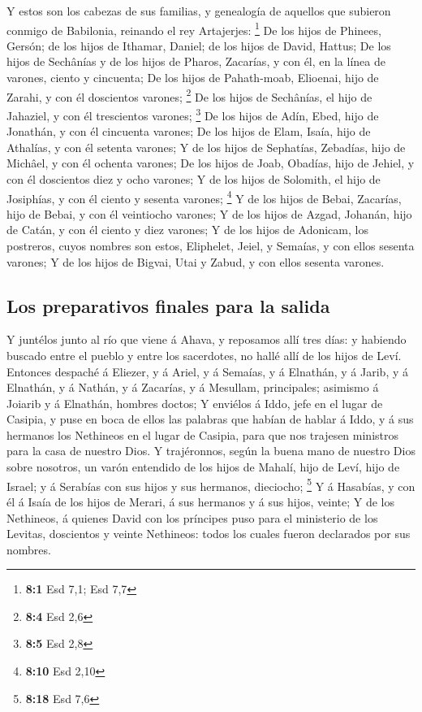  Y estos son los cabezas de sus familias, y genealogía de
aquellos que subieron conmigo de Babilonia, reinando el rey Artajerjes:
\footnote{\textbf{8:1} Esd 7,1; Esd 7,7}  De los hijos de
Phinees, Gersón; de los hijos de Ithamar, Daniel; de los hijos de David,
Hattus;  De los hijos de Sechânías y de los hijos de
Pharos, Zacarías, y con él, en la línea de varones, ciento y cincuenta;
 De los hijos de Pahath-moab, Elioenai, hijo de Zarahi, y
con él doscientos varones; \footnote{\textbf{8:4} Esd 2,6}
 De los hijos de Sechânías, el hijo de Jahaziel, y con él
trescientos varones; \footnote{\textbf{8:5} Esd 2,8}  De
los hijos de Adín, Ebed, hijo de Jonathán, y con él cincuenta varones;
 De los hijos de Elam, Isaía, hijo de Athalías, y con él
setenta varones;  Y de los hijos de Sephatías, Zebadías,
hijo de Michâel, y con él ochenta varones;  De los hijos
de Joab, Obadías, hijo de Jehiel, y con él doscientos diez y ocho
varones;  Y de los hijos de Solomith, el hijo de
Josiphías, y con él ciento y sesenta varones; \footnote{\textbf{8:10}
  Esd 2,10}  Y de los hijos de Bebai, Zacarías, hijo de
Bebai, y con él veintiocho varones;  Y de los hijos de
Azgad, Johanán, hijo de Catán, y con él ciento y diez varones;
 Y de los hijos de Adonicam, los postreros, cuyos nombres
son estos, Eliphelet, Jeiel, y Semaías, y con ellos sesenta varones;
 Y de los hijos de Bigvai, Utai y Zabud, y con ellos
sesenta varones.

\hypertarget{los-preparativos-finales-para-la-salida}{%
\subsection{Los preparativos finales para la
salida}\label{los-preparativos-finales-para-la-salida}}

 Y juntélos junto al río que viene á Ahava, y reposamos
allí tres días: y habiendo buscado entre el pueblo y entre los
sacerdotes, no hallé allí de los hijos de Leví.  Entonces
despaché á Eliezer, y á Ariel, y á Semaías, y á Elnathán, y á Jarib, y á
Elnathán, y á Nathán, y á Zacarías, y á Mesullam, principales; asimismo
á Joiarib y á Elnathán, hombres doctos;  Y enviélos á
Iddo, jefe en el lugar de Casipia, y puse en boca de ellos las palabras
que habían de hablar á Iddo, y á sus hermanos los Nethineos en el lugar
de Casipia, para que nos trajesen ministros para la casa de nuestro
Dios.  Y trajéronnos, según la buena mano de nuestro Dios
sobre nosotros, un varón entendido de los hijos de Mahalí, hijo de Leví,
hijo de Israel; y á Serabías con sus hijos y sus hermanos, dieciocho;
\footnote{\textbf{8:18} Esd 7,6}  Y á Hasabías, y con él
á Isaía de los hijos de Merari, á sus hermanos y á sus hijos, veinte;
 Y de los Nethineos, á quienes David con los príncipes
puso para el ministerio de los Levitas, doscientos y veinte Nethineos:
todos los cuales fueron declarados por sus nombres.


